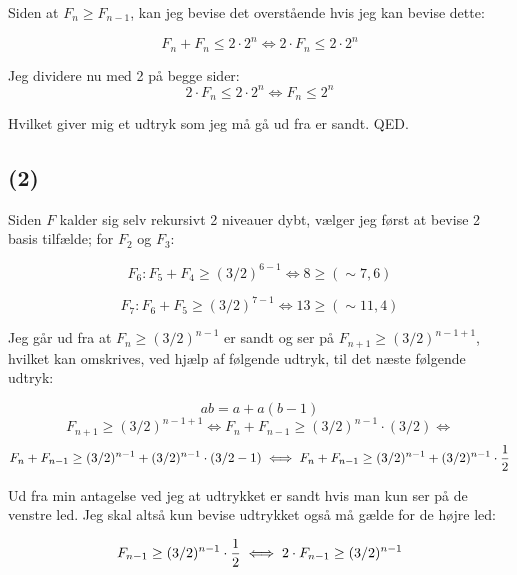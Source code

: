\documentclass[12pt, a4paper, hidelinks]{article}
\begin{document}
Siden at $F_n \geq F_{n-1}$, kan jeg bevise det overstående hvis jeg kan bevise dette:

\begin{equation} F_n + F_n \leq 2 \cdot 2^n \iff 2 \cdot F_n \leq 2 \cdot 2^n  \end{equation}

Jeg dividere nu med 2 på begge sider:
\begin{equation}  2 \cdot F_n \leq 2 \cdot 2^n \iff F_n \leq 2^n \end{equation}

Hvilket giver mig et udtryk som jeg må gå ud fra er sandt. QED.

\subsection{(2)}
Siden $F$ kalder sig selv rekursivt 2 niveauer dybt, vælger jeg først at bevise 2 basis tilfælde; for $F_2$ og $F_3$:


\begin{equation}F_6: F_5 + F_4 \geq (3/2)^{6 - 1} \iff 8 \geq (\sim 7,6)   \end{equation}

\begin{equation}F_7: F_6 + F_5 \geq (3/2)^{7 - 1} \iff 13 \geq (\sim 11,4)  \end{equation}

Jeg går ud fra at $F_n \geq (3/2)^{n - 1}$ er sandt og ser på $F_{n +1} \geq (3/2)^{n - 1 + 1}$, hvilket kan omskrives, ved hjælp af følgende udtryk, til det næste følgende udtryk:

\begin{equation} a b = a + a(b - 1) \end{equation}
\begin{equation}F_{n +1} \geq (3/2)^{n - 1 + 1} \iff F_n + F_{n-1} \geq     (3/2)^{n - 1} \cdot (3/2) \iff   \end{equation}
\begin{equation}  F_n + F_{n-1} \geq     (3/2)^{n - 1} + (3/2)^{n - 1} \cdot (3/2 - 1) \iff   F_n + F_{n-1} \geq     (3/2)^{n - 1} + (3/2)^{n - 1} \cdot {1 \over 2} \end{equation}

Ud fra min antagelse ved jeg at udtrykket er sandt hvis man kun ser på de venstre led. Jeg skal altså kun bevise udtrykket også må gælde for de højre led:

\begin{equation} F_ {n-1} \geq  (3/2)^{n - 1} \cdot {1 \over 2} \iff 2 \cdot  F_ {n-1} \geq (3/2)^{n - 1}\end{equation}
\end{document}

